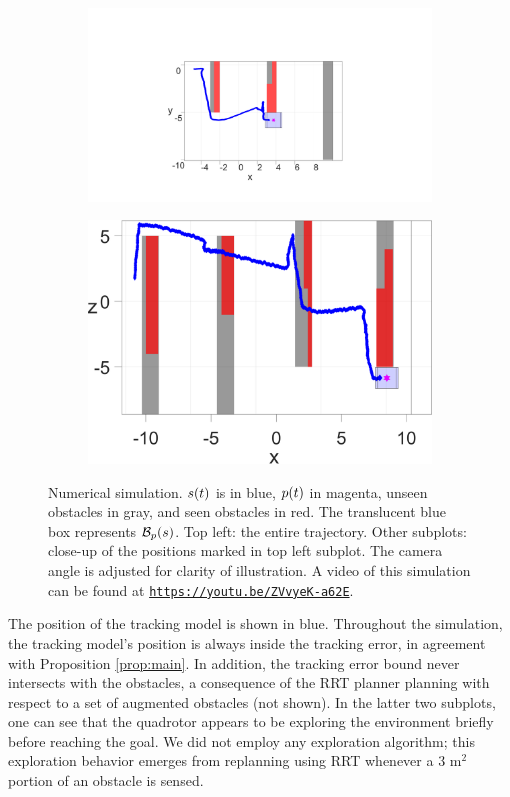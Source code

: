 \begin{figure}
	\begin{subfigure}[t]{0.49\columnwidth} \label{subfig:sim_2}
		\includegraphics[width=\columnwidth]{fig/763}
		\caption{}
	\end{subfigure}  
	\begin{subfigure}[t]{0.49\columnwidth} \label{subfig:sim_3}
		\includegraphics[width=\columnwidth]{fig/1042}
		\caption{}
	\end{subfigure}
	\caption{Numerical simulation. $s(t)$ is in blue, $p(t)$ in magenta, unseen obstacles in gray, and seen obstacles in red. The translucent blue box represents $\mathcal B_p(s)$. Top left: the entire trajectory. Other subplots: close-up of the positions marked in top left subplot. The camera angle is adjusted for clarity of illustration. A video of this simulation can be found at 
	{\tt\href{https://youtu.be/ZVvyeK-a62E}{\nolinkurl{https://youtu.be/ZVvyeK-a62E}}}.
	\label{fig:sim}}
\end{figure}
The position of the tracking model is shown in blue. Throughout the simulation, the tracking model's position is always inside the tracking error, in agreement with Proposition \ref{prop:main}. In addition, the tracking error bound never intersects with the obstacles, a consequence of the RRT planner planning with respect to a set of augmented obstacles (not shown). In the latter two subplots, one can see that the quadrotor appears to be exploring the environment briefly before reaching the goal. We did not employ any exploration algorithm; this exploration behavior emerges from replanning using RRT whenever a $3$ m$^2$ portion of an obstacle is sensed.